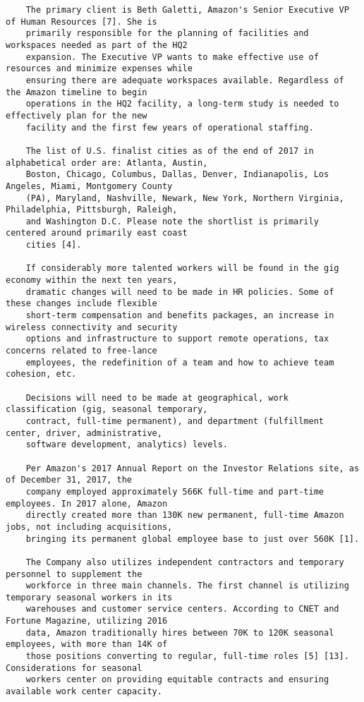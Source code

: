 \documentclass[]{article}
\begin{document}
\begin{verbatim}
    The primary client is Beth Galetti, Amazon's Senior Executive VP of Human Resources [7]. She is 
    primarily responsible for the planning of facilities and workspaces needed as part of the HQ2 
    expansion. The Executive VP wants to make effective use of resources and minimize expenses while 
    ensuring there are adequate workspaces available. Regardless of the Amazon timeline to begin 
    operations in the HQ2 facility, a long-term study is needed to effectively plan for the new 
    facility and the first few years of operational staffing. 

    The list of U.S. finalist cities as of the end of 2017 in alphabetical order are: Atlanta, Austin, 
    Boston, Chicago, Columbus, Dallas, Denver, Indianapolis, Los Angeles, Miami, Montgomery County 
    (PA), Maryland, Nashville, Newark, New York, Northern Virginia, Philadelphia, Pittsburgh, Raleigh, 
    and Washington D.C. Please note the shortlist is primarily centered around primarily east coast 
    cities [4].

    If considerably more talented workers will be found in the gig economy within the next ten years, 
    dramatic changes will need to be made in HR policies. Some of these changes include flexible       
    short-term compensation and benefits packages, an increase in wireless connectivity and security
    options and infrastructure to support remote operations, tax concerns related to free-lance     
    employees, the redefinition of a team and how to achieve team cohesion, etc.

    Decisions will need to be made at geographical, work classification (gig, seasonal temporary, 
    contract, full-time permanent), and department (fulfillment center, driver, administrative, 
    software development, analytics) levels.

    Per Amazon's 2017 Annual Report on the Investor Relations site, as of December 31, 2017, the 
    company employed approximately 566K full-time and part-time employees. In 2017 alone, Amazon 
    directly created more than 130K new permanent, full-time Amazon jobs, not including acquisitions, 
    bringing its permanent global employee base to just over 560K [1].

    The Company also utilizes independent contractors and temporary personnel to supplement the 
    workforce in three main channels. The first channel is utilizing temporary seasonal workers in its 
    warehouses and customer service centers. According to CNET and Fortune Magazine, utilizing 2016 
    data, Amazon traditionally hires between 70K to 120K seasonal employees, with more than 14K of 
    those positions converting to regular, full-time roles [5] [13]. Considerations for seasonal 
    workers center on providing equitable contracts and ensuring available work center capacity.


\end{verbatim}
\end{document}
